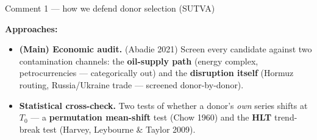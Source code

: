 \documentclass[aspectratio=169,11pt]{beamer}
\newcommand{\src}[1]{{\footnotesize\textcolor{muted}{(#1)}}}
\newcommand{\hd}[1]{\textbf{#1}}
\begin{document}
\begin{frame}{Comment 1 --- how we defend donor selection (SUTVA)}
  \begin{center}
  \end{center}

  \vspace{0.8em}
  \hd{Approaches:}
  \vspace{0.3em}
  \begin{itemize}\setlength\itemsep{0.45em}
    \item[\textcolor{accent}{\hd{$\Rightarrow$}}] \hd{(Main) Economic audit.} \src{Abadie 2021}
      Screen every candidate against two contamination channels: the \hd{oil-supply path}
      (energy complex, petrocurrencies --- categorically out) and the \hd{disruption itself}
      (Hormuz routing, Russia/Ukraine trade --- screened donor-by-donor).
    \item[\textcolor{accent}{\hd{+}}] \hd{Statistical cross-check.}
      Two tests of whether a donor's \emph{own} series shifts at $T_0$ ---
      a \hd{permutation mean-shift} test \src{Chow 1960}
      and the \hd{HLT} trend-break test \src{Harvey, Leybourne \& Taylor 2009}.
  \end{itemize}
\end{frame}

\end{document}

